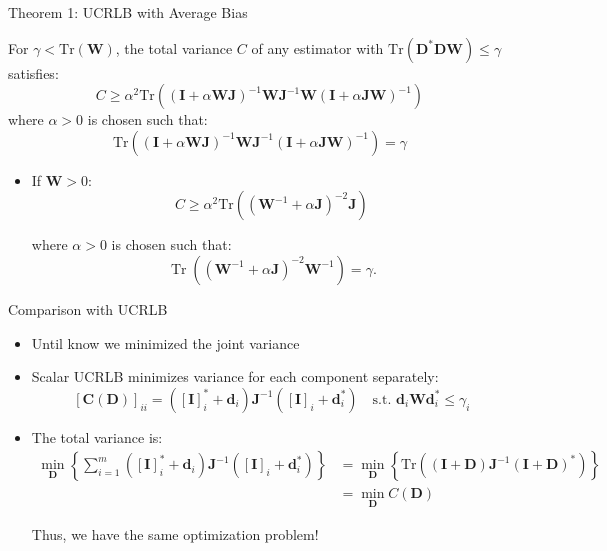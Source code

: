 \documentclass{beamer}
\begin{document}
\begin{frame}{Theorem 1: UCRLB with Average Bias}
\begin{theorem}[Theorem 1]
For $\gamma < \text{Tr}(\mathbf{W})$, the total variance $C$ of any estimator with $\text{Tr}(\mathbf{D}^*\mathbf{D}\mathbf{W}) \leq \gamma$ satisfies:
\[ C \geq \alpha^2\text{Tr}((\mathbf{I} + \alpha\mathbf{W}\mathbf{J})^{-1}\mathbf{W}\mathbf{J}^{-1}\mathbf{W}(\mathbf{I} + \alpha\mathbf{J}\mathbf{W})^{-1}) \]
where $\alpha > 0$ is chosen such that:
\[ \text{Tr}((\mathbf{I} + \alpha\mathbf{W}\mathbf{J})^{-1}\mathbf{W}\mathbf{J}^{-1}(\mathbf{I} + \alpha\mathbf{J}\mathbf{W})^{-1}) = \gamma \]
\end{theorem}

\begin{itemize}
\item If $\mathbf{W} > 0$:
\[ C \geq \alpha^2\text{Tr}((\mathbf{W}^{-1} + \alpha\mathbf{J})^{-2}\mathbf{J}) \]

where  $\alpha > 0$ is chosen such that:
\[
\operatorname{Tr}((\mathbf{W}^{-1} + \alpha \mathbf{J})^{-2}\mathbf{W}^{-1}) = \gamma.
\]
\end{itemize}
\end{frame}

\begin{frame}{Comparison with UCRLB}
\begin{itemize}
    \item Until know we minimized the joint variance
    \item Scalar UCRLB minimizes variance for each component separately:
    \[
    \left[\mathbf{C}(\mathbf{D})\right]_{ii} = (\left[\mathbf{I}\right]_i^* + \mathbf{d}_i)\mathbf{J}^{-1}
    (\left[\mathbf{I}\right]_i + \mathbf{d}_i^*) \quad \text{s.t. } \mathbf{d}_i \mathbf{W} \mathbf{d}_i^* 
    \leq \gamma_i
    \]
    \item The total variance is:
    \begin{align*}
    \min_{\mathbf{D}} \left\{ \sum_{i=1}^{m} (\left[\mathbf{I}\right]_i^* + \mathbf{d}_i)\mathbf{J}^{-1}(\left[\mathbf{I}\right]_i +
    \mathbf{d}_i^*) \right\}
    &= \min_{\mathbf{D}} \left\{ \text{Tr}\left((\mathbf{I}+\mathbf{D})\mathbf{J}^{-1}(\mathbf{I} +
    \mathbf{D})^*\right) \right\} \\
    &= \min_{\mathbf{D}} C(\mathbf{D})
    \end{align*}

    Thus, we have the same optimization problem!
    
\end{itemize}
\end{frame}
\end{document}
